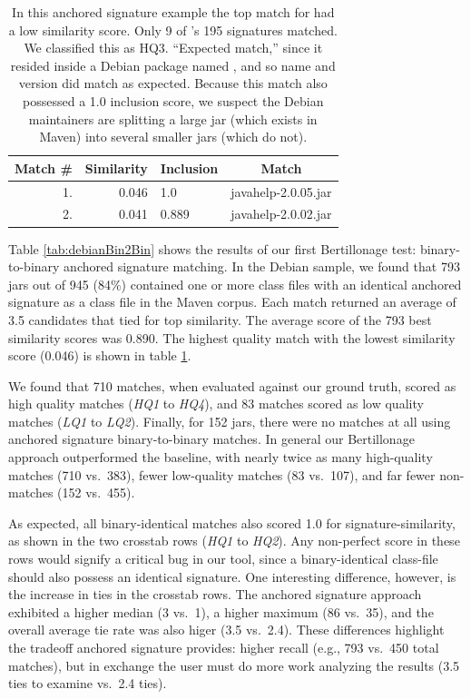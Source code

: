 \begin{table}[h]
  \centering
\begin{tabular}[htbp]{r|r|l|l}
\textbf{Match \#}  & \textbf{Similarity} & \textbf{Inclusion} & \multicolumn{1}{c}{\textbf{Match}} \\
\hline
1.        & 0.046 & 1.0   &         javahelp-2.0.05.jar \\
2.        & 0.041 & 0.889 &         javahelp-2.0.02.jar \\
\end{tabular}
  \caption{
    In this anchored signature example the top match for
     had a low similarity score. Only
    9 of 's 195 signatures matched.  We
    classified this as HQ3. ``Expected match,'' since it resided inside a
    Debian package named , and so
    name and version did match as expected.  Because this match also
    possessed a 1.0 inclusion score, we suspect the Debian maintainers are
    splitting a large jar (which exists in Maven) into several smaller jars
    (which do not).  }
  \label{tab:046similarity}
\end{table}

Table \ref{tab:debianBin2Bin} shows the results of our first Bertillonage
test:  binary-to-binary anchored signature matching.  In the Debian sample,
we found that 793 jars out of 945 (84\%) contained one or more class files
with an identical anchored signature as a class file in the Maven corpus.
Each match returned an average of 3.5 candidates that tied for top
similarity.  The average score of the 793 best similarity scores was
0.890.  The highest quality match with the lowest similarity score (0.046)
is shown in table \ref{tab:046similarity}.

We found that 710 matches, when evaluated against our ground truth, scored
as high quality matches (\emph{HQ1} to \emph{HQ4}), and 83 matches scored
as low quality matches (\emph{LQ1} to \emph{LQ2}).  Finally, for 152 jars,
there were no matches at all using anchored signature binary-to-binary
matches.  In general our Bertillonage approach outperformed the baseline,
with nearly twice as many high-quality matches (710 vs.\ 383), fewer
low-quality matches (83 vs.\ 107), and far fewer non-matches (152 vs.\ 455).

As expected, all binary-identical matches also scored 1.0 for
signature-similarity, as shown in the two crosstab rows (\emph{HQ1} to
\emph{HQ2}).  Any non-perfect score in these rows would signify a critical
bug in our tool, since a binary-identical class-file should also possess an
identical signature.  One interesting difference, however, is the increase
in ties in the crosstab rows.  The anchored signature approach exhibited a
higher median (3 vs.\ 1), a higher maximum (86 vs.\ 35), and the overall
average tie rate was also higer (3.5 vs.\ 2.4).  These differences highlight
the tradeoff anchored signature provides:  higher recall (e.g., 793 vs.\ 450
total matches), but in exchange the user must do more work analyzing the
results (3.5 ties to examine vs.\ 2.4 ties).



